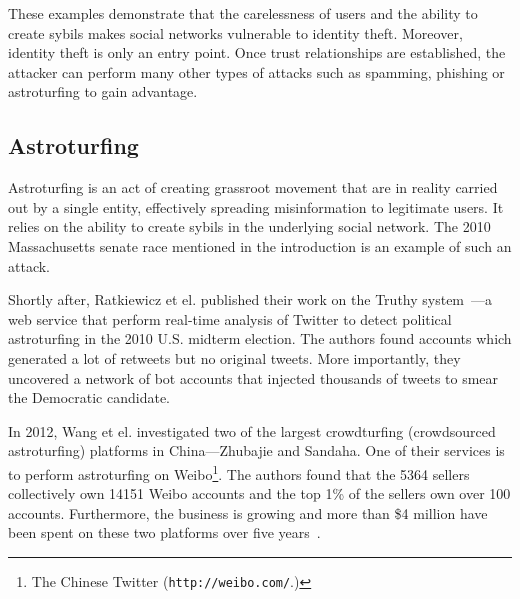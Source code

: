 These examples demonstrate that the carelessness of users and the ability to
create sybils makes social networks vulnerable to identity theft. Moreover,
identity theft is only an entry point. Once trust relationships are established,
the attacker can perform many other types of attacks such as spamming, phishing
or astroturfing to gain advantage.

\subsection{Astroturfing}
Astroturfing is an act of creating grassroot movement that are in reality
carried out by a single entity, effectively spreading misinformation to
legitimate users. It relies on the ability to create sybils in the underlying
social network. The 2010 Massachusetts senate race mentioned in the introduction
is an example of such an attack.

\begin{comment}
In the 2010 Massachusetts senate race, Mustafaraj and Metaxas found evidence
that Republican campaigners created fake Twitter accounts and used them to send
spam. The spam caused Google real-time search results to tip in their favour
thus causing a spread of misinformation~\cite{mustafaraj2010obscurity}.
Ratkiewicz et el. suggest that this type of attack can be mounted cheaply and
may have a larger influence than traditional
advertising~\cite{ratkiewicz2011truthy}.
\end{comment}

Shortly after, Ratkiewicz et el. published their work on the Truthy
system~\cite{ratkiewicz2011truthy}---a web service that perform real-time
analysis of Twitter to detect political astroturfing in the 2010 U.S. midterm
election. The authors found accounts which generated a lot of retweets but no
original tweets. More importantly, they uncovered a network of bot accounts that
injected thousands of tweets to smear the Democratic candidate.

In 2012, Wang et el. investigated two of the largest crowdturfing (crowdsourced
astroturfing) platforms in China---Zhubajie and Sandaha. One of their services
is to perform astroturfing on Weibo\footnote{The Chinese Twitter
  (\texttt{http://weibo.com/}.)}. The authors found that the 5364 sellers
collectively own 14151 Weibo accounts and the top 1\% of the sellers own over
100 accounts. Furthermore, the business is growing and more than \$4 million
have been spent on these two platforms over five years~\cite{wang2012serf}.

